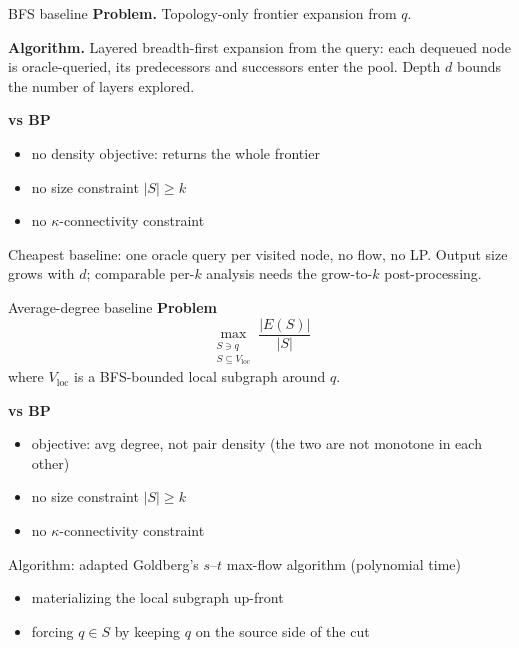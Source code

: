 \documentclass{beamer}
\begin{document}
\begin{frame}{BFS baseline}
  \textbf{Problem.} Topology-only frontier expansion from $q$.

  \vfill

  \textbf{Algorithm.} Layered breadth-first expansion from the query: each dequeued node is oracle-queried, its predecessors and successors enter the pool. Depth $d$ bounds the number of layers explored.

  \vfill

  \textbf{vs BP}
  \begin{itemize}
    \item no density objective: returns the whole frontier
    \item no size constraint $|S| \ge k$
    \item no $\kappa$-connectivity constraint
  \end{itemize}

  \vfill

  \footnotesize Cheapest baseline: one oracle query per visited node, no flow, no LP. Output size grows with $d$; comparable per-$k$ analysis needs the grow-to-$k$ post-processing.
\end{frame}

\begin{frame}{Average-degree baseline}
  \textbf{Problem}
  \[
    \max_{\substack{S \ni q \\ S \subseteq V_{\mathrm{loc}}}} \frac{|E(S)|}{|S|}
  \]
  where $V_{\mathrm{loc}}$ is a BFS-bounded local subgraph around $q$.

  \vfill

  \textbf{vs BP}
  \begin{itemize}
    \item objective: avg degree, not pair density (the two are not monotone in each other)
    \item no size constraint $|S| \ge k$
    \item no $\kappa$-connectivity constraint
  \end{itemize}

  \vfill

  \footnotesize Algorithm: adapted Goldberg's $s$--$t$ max-flow algorithm (polynomial time)
  \begin{itemize}
    \item materializing the local subgraph up-front
    \item forcing $q \in S$ by keeping $q$ on the source side of the cut
  \end{itemize}
\end{frame}
\end{document}
